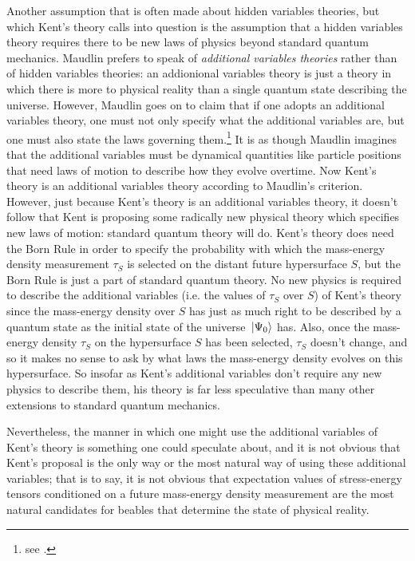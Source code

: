 Another assumption that is often made about hidden variables theories, but which Kent's theory calls into question is the assumption that a hidden variables theory requires there to be new laws of physics beyond standard quantum mechanics.  Maudlin prefers to speak of \emph{additional variables theories} rather than of hidden variables theories: an addionional variables theory is just a theory in which there is more to physical reality than a single quantum state describing the universe. However, Maudlin goes on to claim that if one adopts  an additional variables theory, one must not only specify what the additional variables are, but one must also state the laws governing them.\footnote{see \cite[9]{MAUDLINT1995Tmp}. } It is as though Maudlin  imagines that the additional variables must be dynamical quantities like particle positions that need laws of motion to describe how they evolve overtime. Now Kent's theory is an additional variables theory according to Maudlin's criterion. However, just because Kent's theory is an additional variables theory, it doesn't follow that Kent is proposing some radically new physical theory which specifies new laws of motion: standard quantum theory will do. Kent's theory does need the Born Rule in order to specify the probability with which the mass-energy density measurement $\tau_S$ is selected on the distant future hypersurface $S$, but the Born Rule is just a part of standard quantum theory. No new physics is required to describe the additional variables (i.e. the values of $\tau_S$ over $S$)  of Kent's theory since the mass-energy density over $S$ has just as much right to be described by a quantum state as the initial state  of the universe $\ket*{\Psi_0}$ has. Also, once the mass-energy density $\tau_S$ on the hypersurface $S$ has been selected, $\tau_S$ doesn't change, and so it makes no sense to ask by what laws the mass-energy density evolves on this hypersurface. So insofar as Kent's additional variables don't require any new physics to describe them, his theory is far less speculative than many other extensions to standard quantum mechanics. 

Nevertheless, the manner in which one might use the additional variables of Kent's theory is something one could speculate about, and it is not obvious that Kent's proposal is the only way or the most natural way of using these additional variables; that is to say, it is not obvious that expectation values of stress-energy tensors conditioned on a future mass-energy density measurement are the most natural candidates for beables that determine the state of physical reality.  

